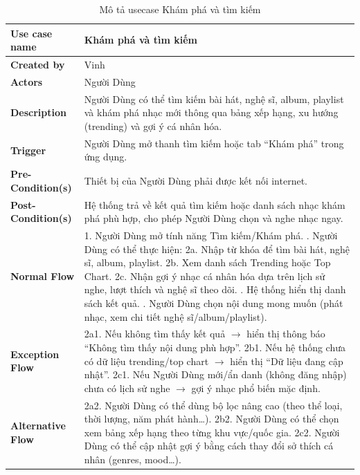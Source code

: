 \documentclass[a4paper]{article}
\newcommand{\cach}{\hspace*{1.5em}\ignorespaces}
\begin{document}
\begin{table}[h!]
\centering
\renewcommand{\arraystretch}{1.3} %
\begin{tabularx}{\textwidth}{|l|X|}
\hline
\textbf{Use case name} & Khám phá và tìm kiếm \\ \hline
\textbf{Created by}    & Vinh \\ \hline
\textbf{Actors}        & Người Dùng \\ \hline
\textbf{Description}   & Người Dùng có thể tìm kiếm bài hát, nghệ sĩ, album, playlist và khám phá nhạc mới thông qua bảng xếp hạng, xu hướng (trending) và gợi ý cá nhân hóa. \\ \hline
\textbf{Trigger}       & Người Dùng mở thanh tìm kiếm hoặc tab “Khám phá” trong ứng dụng. \\ \hline
\textbf{Pre-Condition(s)} 
& Thiết bị của Người Dùng phải được kết nối internet. \\ \hline
\textbf{Post-Condition(s)} 
& Hệ thống trả về kết quả tìm kiếm hoặc danh sách nhạc khám phá phù hợp, cho phép Người Dùng chọn và nghe nhạc ngay. \\ \hline
\textbf{Normal Flow}   
& 1. Người Dùng mở tính năng Tìm kiếm/Khám phá. \newline
  2. Người Dùng có thể thực hiện: \newline
  \cach 2a. Nhập từ khóa để tìm bài hát, nghệ sĩ, album, playlist. \newline
  \cach 2b. Xem danh sách Trending hoặc Top Chart. \newline
  \cach 2c. Nhận gợi ý nhạc cá nhân hóa dựa trên lịch sử nghe, lượt thích và nghệ sĩ theo dõi. \newline
  3. Hệ thống hiển thị danh sách kết quả. \newline
  4. Người Dùng chọn nội dung mong muốn (phát nhạc, xem chi tiết nghệ sĩ/album/playlist). \\ \hline
\textbf{Exception Flow} 
& 2a1. Nếu không tìm thấy kết quả $\rightarrow$ hiển thị thông báo “Không tìm thấy nội dung phù hợp”. \newline
  2b1. Nếu hệ thống chưa có dữ liệu trending/top chart $\rightarrow$ hiển thị “Dữ liệu đang cập nhật”. \newline
  2c1. Nếu Người Dùng mới/ẩn danh (không đăng nhập) chưa có lịch sử nghe $\rightarrow$ gợi ý nhạc phổ biến mặc định. \\ \hline
\textbf{Alternative Flow} 
& 2a2. Người Dùng có thể dùng bộ lọc nâng cao (theo thể loại, thời lượng, năm phát hành…). \newline
  2b2. Người Dùng có thể chọn xem bảng xếp hạng theo từng khu vực/quốc gia. \newline
  2c2. Người Dùng có thể cập nhật gợi ý bằng cách thay đổi sở thích cá nhân (genres, mood…). \\ \hline
\end{tabularx}
\caption{Mô tả usecase Khám phá và tìm kiếm}
\end{table}
\end{document}
